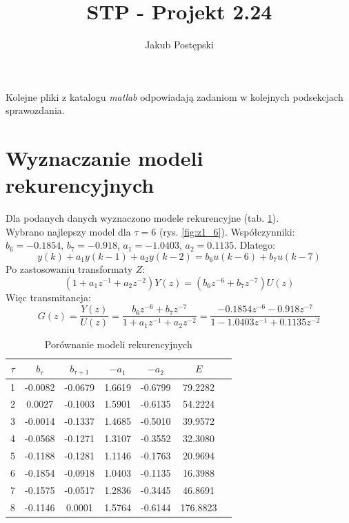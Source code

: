 \documentclass[a4paper, 10pt]{article}
\author{Jakub Postępski}
\title{STP - Projekt 2.24}
\begin{document}
	\maketitle
	Kolejne pliki z katalogu \textit{matlab} odpowiadają zadaniom w kolejnych podsekcjach sprawozdania.
	\section{Wyznaczanie modeli rekurencyjnych}
	Dla podanych danych wyznaczono modele rekurencyjne (tab. \ref{tab:z1}).\\
	Wybrano najlepszy model dla $\tau=6$ (rys. \ref{fig:z1_6}). 	Współczynniki: $b_6 = -0.1854$, $b_7=-0.918$, $a_1=-1.0403$, $a_2=0.1135$.
	Dlatego:
	\[y(k)+a_1y(k-1) + a_2y(k-2)=b_6u(k-6)+b_7u(k-7)\]
	Po zastosowaniu transformaty $Z$:
	\[(1+a_1z^{-1} + a_2z^{-2})Y(z)=(b_6z^{-6}+b_7z^{-7})U(z)\]
	Więc transmitancja:
	\[G(z)=\frac{Y(z)}{U(z)}=\frac{b_6z^{-6}+b_7z^{-7}}{1+a_1z^{-1} + a_2z^{-2}}=\frac{-0.1854z^{-6}-0.918z^{-7}}{1-1.0403z^{-1} + 0.1135z^{-2}}\]
	\begin{table}[H]
	\centering
	\begin{tabular}{|c|c|c|c|c|c|c|}
	\hline 
	$\tau$ & $b_\tau$ & $b_{\tau+1}$ & $-a_1$ & $-a_2$ & $E$  \\ 
	\hline 
	 1 & -0.0082 & -0.0679 &  1.6619 & -0.6799
	  & 79.2282 \\ 
	\hline 
	2 & 0.0027 & -0.1003
	  &  1.5901 & -0.6135 & 54.2224 \\ 
	\hline 
	3 & -0.0014 & -0.1337 &  1.4685  & -0.5010 & 39.9572\\ 
	\hline 
	4 & -0.0568 & -0.1271 & 1.3107 & -0.3552
	  & 32.3080  \\ 
	\hline 
 5 & -0.1188 & -0.1281 & 1.1146 &  -0.1763 & 20.9694 \\ 
	\hline 
	6 & -0.1854  &  -0.0918 &  1.0403  & -0.1135 & 16.3988 \\ 
	\hline 
	7 & -0.1575 & -0.0517  & 1.2836 & -0.3445  & 46.8691
	\\ 
	\hline
	8 & -0.1146 & 0.0001  & 1.5764 & -0.6144 & 176.8823 \\ 
	\hline 
	\end{tabular}
	\label{tab:z1}
	\caption{Porównanie modeli rekurencyjnych}
	\end{table}
	
\end{document}

